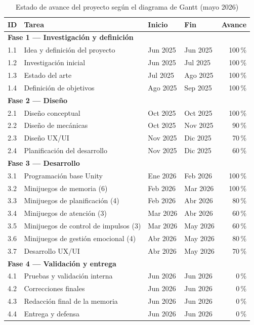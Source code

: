 \documentclass[12pt, a4paper]{report}
\begin{document}
\begin{table}[H]
\centering
\caption{Estado de avance del proyecto según el diagrama de Gantt (mayo 2026)}
\label{tab:gantt}
\renewcommand{\arraystretch}{1.25}
\begin{tabularx}{\textwidth}{|l|X|l|l|r|}
\hline
\textbf{ID} & \textbf{Tarea} & \textbf{Inicio} & \textbf{Fin} & \textbf{Avance} \\
\hline
\multicolumn{5}{|l|}{\textbf{Fase 1 — Investigación y definición}} \\
\hline
1.1 & Idea y definición del proyecto & Jun 2025 & Jun 2025 & 100\,\% \\
\hline
1.2 & Investigación inicial & Jun 2025 & Jul 2025 & 100\,\% \\
\hline
1.3 & Estado del arte & Jul 2025 & Ago 2025 & 100\,\% \\
\hline
1.4 & Definición de objetivos & Ago 2025 & Sep 2025 & 100\,\% \\
\hline
\multicolumn{5}{|l|}{\textbf{Fase 2 — Diseño}} \\
\hline
2.1 & Diseño conceptual & Oct 2025 & Oct 2025 & 100\,\% \\
\hline
2.2 & Diseño de mecánicas & Oct 2025 & Nov 2025 & 90\,\% \\
\hline
2.3 & Diseño UX/UI & Nov 2025 & Dic 2025 & 70\,\% \\
\hline
2.4 & Planificación del desarrollo & Nov 2025 & Dic 2025 & 60\,\% \\
\hline
\multicolumn{5}{|l|}{\textbf{Fase 3 — Desarrollo}} \\
\hline
3.1 & Programación base Unity & Ene 2026 & Feb 2026 & 100\,\% \\
\hline
3.2 & Minijuegos de memoria (6) & Feb 2026 & Mar 2026 & 100\,\% \\
\hline
3.3 & Minijuegos de planificación (4) & Feb 2026 & Abr 2026 & 80\,\% \\
\hline
3.4 & Minijuegos de atención (3) & Mar 2026 & Abr 2026 & 60\,\% \\
\hline
3.5 & Minijuegos de control de impulsos (3) & Mar 2026 & May 2026 & 60\,\% \\
\hline
3.6 & Minijuegos de gestión emocional (4) & Abr 2026 & May 2026 & 80\,\% \\
\hline
3.7 & Desarrollo UX/UI & Abr 2026 & May 2026 & 70\,\% \\
\hline
\multicolumn{5}{|l|}{\textbf{Fase 4 — Validación y entrega}} \\
\hline
4.1 & Pruebas y validación interna & Jun 2026 & Jun 2026 & 0\,\% \\
\hline
4.2 & Correcciones finales & Jun 2026 & Jun 2026 & 0\,\% \\
\hline
4.3 & Redacción final de la memoria & Jun 2026 & Jun 2026 & 0\,\% \\
\hline
4.4 & Entrega y defensa & Jun 2026 & Jun 2026 & 0\,\% \\
\hline
\end{tabularx}
\end{table}
\end{document}
